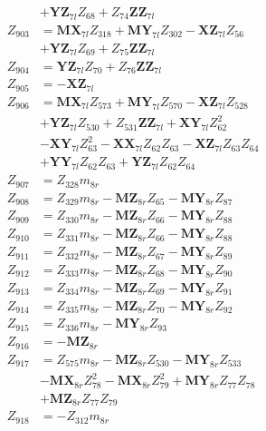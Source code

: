 \begin{multicols}{2}
\begin{align}
&+ \mathbf{YZ}_{7l}Z_{68} + Z_{74}\mathbf{ZZ}_{7l} \nonumber \\
Z_{903} &= \mathbf{MX}_{7l}Z_{318} + \mathbf{MY}_{7l}Z_{302} - \mathbf{XZ}_{7l}Z_{56}  \nonumber \\
&+ \mathbf{YZ}_{7l}Z_{69} + Z_{75}\mathbf{ZZ}_{7l} \nonumber \\
Z_{904} &= \mathbf{YZ}_{7l}Z_{70} + Z_{76}\mathbf{ZZ}_{7l} \nonumber \\
Z_{905} &= -\mathbf{XZ}_{7l} \nonumber \\
Z_{906} &= \mathbf{MX}_{7l}Z_{573} + \mathbf{MY}_{7l}Z_{570} - \mathbf{XZ}_{7l}Z_{528}  \nonumber \\
&+ \mathbf{YZ}_{7l}Z_{530} + Z_{531}\mathbf{ZZ}_{7l} + \mathbf{XY}_{7l}Z_{62}^2  \nonumber \\
&- \mathbf{XY}_{7l}Z_{63}^2 - \mathbf{XX}_{7l}Z_{62}Z_{63} - \mathbf{XZ}_{7l}Z_{63}Z_{64}  \nonumber \\
&+ \mathbf{YY}_{7l}Z_{62}Z_{63} + \mathbf{YZ}_{7l}Z_{62}Z_{64} \nonumber \\
Z_{907} &= Z_{328}m_{8r} \nonumber \\
Z_{908} &= Z_{329}m_{8r} - \mathbf{MZ}_{8r}Z_{65} - \mathbf{MY}_{8r}Z_{87} \nonumber \\
Z_{909} &= Z_{330}m_{8r} - \mathbf{MZ}_{8r}Z_{66} - \mathbf{MY}_{8r}Z_{88} \nonumber \\
Z_{910} &= Z_{331}m_{8r} - \mathbf{MZ}_{8r}Z_{66} - \mathbf{MY}_{8r}Z_{88} \nonumber \\
Z_{911} &= Z_{332}m_{8r} - \mathbf{MZ}_{8r}Z_{67} - \mathbf{MY}_{8r}Z_{89} \nonumber \\
Z_{912} &= Z_{333}m_{8r} - \mathbf{MZ}_{8r}Z_{68} - \mathbf{MY}_{8r}Z_{90} \nonumber \\
Z_{913} &= Z_{334}m_{8r} - \mathbf{MZ}_{8r}Z_{69} - \mathbf{MY}_{8r}Z_{91} \nonumber \\
Z_{914} &= Z_{335}m_{8r} - \mathbf{MZ}_{8r}Z_{70} - \mathbf{MY}_{8r}Z_{92} \nonumber \\
Z_{915} &= Z_{336}m_{8r} - \mathbf{MY}_{8r}Z_{93} \nonumber \\
Z_{916} &= -\mathbf{MZ}_{8r} \nonumber \\
Z_{917} &= Z_{575}m_{8r} - \mathbf{MZ}_{8r}Z_{530} - \mathbf{MY}_{8r}Z_{533}  \nonumber \\
&- \mathbf{MX}_{8r}Z_{78}^2 - \mathbf{MX}_{8r}Z_{79}^2 + \mathbf{MY}_{8r}Z_{77}Z_{78}  \nonumber \\
&+ \mathbf{MZ}_{8r}Z_{77}Z_{79} \nonumber \\
Z_{918} &= -Z_{312}m_{8r} \nonumber \\

\end{align}
\end{multicols}
